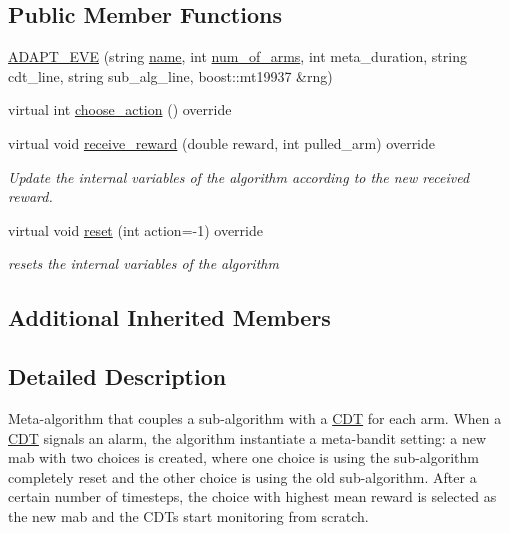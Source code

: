 \subsection*{Public Member Functions}
\begin{DoxyCompactItemize}
\item 
\mbox{\hyperlink{class_a_d_a_p_t___e_v_e_a81ea2b56ec21016d72e621fbd52a8ae0}{A\+D\+A\+P\+T\+\_\+\+E\+VE}} (string \mbox{\hyperlink{class_m_a_b_algorithm_a77b10ecc4b49d519c557f65358167b82}{name}}, int \mbox{\hyperlink{class_m_a_b_algorithm_a340fa9e83e85b092f2c6125fc4e8549b}{num\+\_\+of\+\_\+arms}}, int meta\+\_\+duration, string cdt\+\_\+line, string sub\+\_\+alg\+\_\+line, boost\+::mt19937 \&rng)
\item 
virtual int \mbox{\hyperlink{class_a_d_a_p_t___e_v_e_aa878cacd23fbe8743493623f8a9be6d6}{choose\+\_\+action}} () override
\item 
virtual void \mbox{\hyperlink{class_a_d_a_p_t___e_v_e_ab626b3d8e8f27200e35a0fc3c80f9539}{receive\+\_\+reward}} (double reward, int pulled\+\_\+arm) override
\begin{DoxyCompactList}\small\item\em Update the internal variables of the algorithm according to the new received reward. \end{DoxyCompactList}\item 
virtual void \mbox{\hyperlink{class_a_d_a_p_t___e_v_e_aa89f094cbcba01accada672f0924a5f3}{reset}} (int action=-\/1) override
\begin{DoxyCompactList}\small\item\em resets the internal variables of the algorithm \end{DoxyCompactList}\end{DoxyCompactItemize}
\subsection*{Additional Inherited Members}


\subsection{Detailed Description}
Meta-\/algorithm that couples a sub-\/algorithm with a \mbox{\hyperlink{class_c_d_t}{C\+DT}} for each arm. When a \mbox{\hyperlink{class_c_d_t}{C\+DT}} signals an alarm, the algorithm instantiate a meta-\/bandit setting\+: a new mab with two choices is created, where one choice is using the sub-\/algorithm completely reset and the other choice is using the old sub-\/algorithm. After a certain number of timesteps, the choice with highest mean reward is selected as the new mab and the C\+D\+Ts start monitoring from scratch. 


